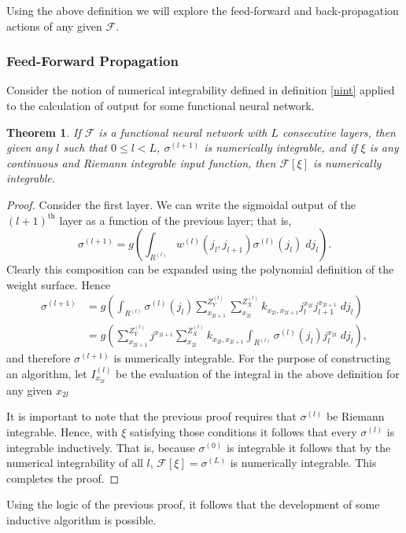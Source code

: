\documentclass[titlepage, twoside]{article}
\numberwithin{equation}{subsection}
\newtheorem{theorem}{Theorem}
\numberwithin{theorem}{subsection}
\begin{document}
Using the above definition we will explore the feed-forward and back-propagation actions of any given $\mathcal{F}$.












\subsubsection{Feed-Forward Propagation}

Consider the notion of numerical integrability defined in definition \ref{nint} applied to the calculation of output for some functional neural network.

\begin{theorem}
If $\mathcal{F}$ is a functional neural network with $L$ consecutive layers, then given any $l$ such that $0\leq l <  L$, $\sigma^{(l+1)}$ is numerically integrable, and if $\xi$ is any continuous and Riemann integrable input function, then $\mathcal{F}[\xi]$ is numerically integrable.
\end{theorem}

\begin{proof}
Consider the first layer. We can write the sigmoidal output of the $(l+1)^{\mathrm{th}}$ layer as a function of the previous layer; that is,
\begin{equation}
\sigma^{(l+1)} = g\left(\int_{R^{(l)}} w^{(l)}(j_l, j_{l+1})\sigma^{(l)}(j_{l})\; dj_{l}\right).
\end{equation}
Clearly this composition can be expanded using the polynomial definition of the weight surface. Hence
\begin {equation}
\begin{aligned}
\sigma^{(l+1)} &= g\left(\int_{R^{(l)}}\sigma^{(l)}(j_l)\sum_{x_{2l+1}}^{Z^{(l)}_Y}\sum_{x_{2l}}^{Z^{(l)}_X}{k_{x_{2l},x_{2l+1}}j_l^{x_{2l}}j_{l+1}^{x_{2l+1}}\;dj_l}\right) \\
&= g\left(\sum_{x_{2l+1}}^{Z^{(l)}_Y}j^{x_{2l+1}}\sum_{x_{2l}}^{Z^{(l)}_X}{k_{x_{2l},x_{2l+1}}}\int_{R^{(l)}} \sigma^{(l)}(j_l)j_l^{x_{2l}}\; dj_l\right),
\end{aligned}
\end{equation}
and therefore $\sigma^{(l+1)}$ is numerically integrable. For the purpose of constructing an algorithm, let $I^{(l)}_{x_{2l}}$ be the evaluation of the integral in the above definition for any given $x_{2l}$

It is important to note that the previous proof requires that $\sigma^{(l)}$ be Riemann integrable. Hence, with $\xi$ satisfying those conditions it follows that every $\sigma^{(l)}$ is integrable inductively. That is, because $\sigma^{(0)}$ is integrable it follows that by the numerical integrability of all $l$, $\mathcal{F}[\xi] = \sigma^{(L)}$ is numerically integrable. This completes the proof.
\end{proof}
Using the logic of the previous proof, it follows that the development of some inductive algorithm is possible. 
\end{document}
